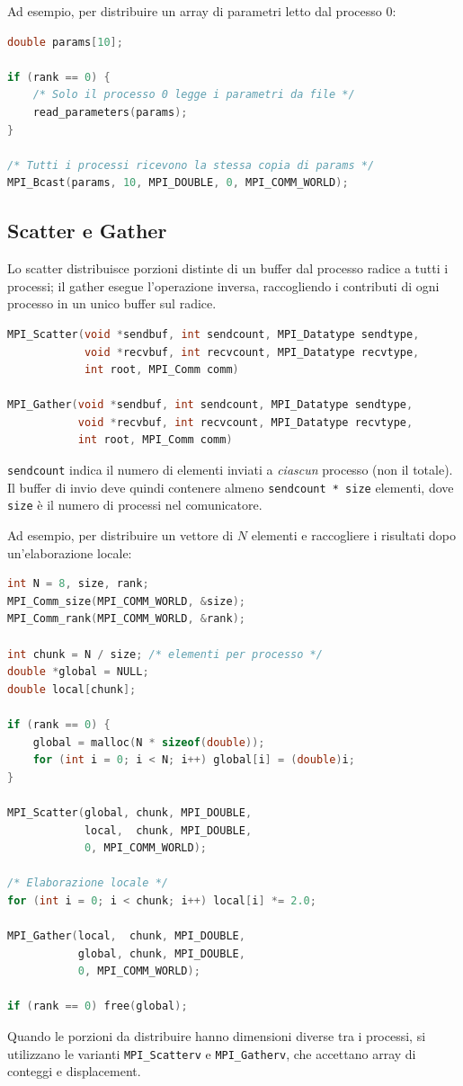 Ad esempio, per distribuire un array di parametri letto dal processo 0:
\begin{lstlisting}[language=C, numbers=none]
double params[10];

if (rank == 0) {
    /* Solo il processo 0 legge i parametri da file */
    read_parameters(params);
}

/* Tutti i processi ricevono la stessa copia di params */
MPI_Bcast(params, 10, MPI_DOUBLE, 0, MPI_COMM_WORLD);
\end{lstlisting}

\subsection{Scatter e Gather}
Lo scatter distribuisce porzioni distinte di un buffer dal processo radice a tutti i processi; il gather esegue l'operazione inversa, raccogliendo i contributi di ogni processo in un unico buffer sul radice.
\begin{lstlisting}[language=C, numbers=none]
MPI_Scatter(void *sendbuf, int sendcount, MPI_Datatype sendtype,
            void *recvbuf, int recvcount, MPI_Datatype recvtype,
            int root, MPI_Comm comm)

MPI_Gather(void *sendbuf, int sendcount, MPI_Datatype sendtype,
           void *recvbuf, int recvcount, MPI_Datatype recvtype,
           int root, MPI_Comm comm)
\end{lstlisting}
\texttt{sendcount} indica il numero di elementi inviati a \emph{ciascun} processo (non il totale). Il buffer di invio deve quindi contenere almeno \texttt{sendcount * size} elementi, dove \texttt{size} è il numero di processi nel comunicatore.

Ad esempio, per distribuire un vettore di \(N\) elementi e raccogliere i risultati dopo un'elaborazione locale:
\begin{lstlisting}[language=C, numbers=none]
int N = 8, size, rank;
MPI_Comm_size(MPI_COMM_WORLD, &size);
MPI_Comm_rank(MPI_COMM_WORLD, &rank);

int chunk = N / size; /* elementi per processo */
double *global = NULL;
double local[chunk];

if (rank == 0) {
    global = malloc(N * sizeof(double));
    for (int i = 0; i < N; i++) global[i] = (double)i;
}

MPI_Scatter(global, chunk, MPI_DOUBLE,
            local,  chunk, MPI_DOUBLE,
            0, MPI_COMM_WORLD);

/* Elaborazione locale */
for (int i = 0; i < chunk; i++) local[i] *= 2.0;

MPI_Gather(local,  chunk, MPI_DOUBLE,
           global, chunk, MPI_DOUBLE,
           0, MPI_COMM_WORLD);

if (rank == 0) free(global);
\end{lstlisting}
Quando le porzioni da distribuire hanno dimensioni diverse tra i processi, si utilizzano le varianti \texttt{MPI\_Scatterv} e \texttt{MPI\_Gatherv}, che accettano array di conteggi e displacement.

